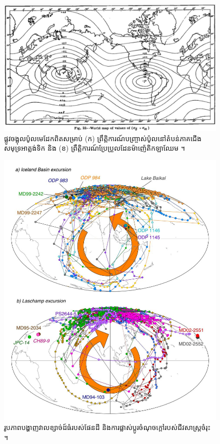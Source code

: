 \documentclass[10pt,twocolumn,letterpaper]{article}
\begin{document}
\begin{figure}[t]
\begin{center}
   \includegraphics[width=1\linewidth]{meinesz3.jpg}
\end{center}
   \caption{ផ្លូវចង្អុលប៉ូលមេដែកពិតសម្រាប់ (ក) ព្រឹត្តិការណ៍បញ្ច្រាស់ប៉ូលនៅតំបន់ភាគជើងសមុទ្រអាត្លង់ទិក និង (ខ) ព្រឹត្តិការណ៍ប្រែប្រួលដែនម៉ាញ៉េតិកឡាឈែម \cite{36}។}
\label{fig:8}

\label{fig:onecol}
\end{figure}

\begin{figure}[t]
\begin{center}
   \includegraphics[width=0.92\linewidth]{laj.jpg}
\end{center}
   \caption{រូបភាពបង្ហាញវាលខ្សាច់ដ៍ធំរបស់ផែនដី និង​ការផ្លាស់ប្តូរចំណុចក្តៅរបស់ជីវសាស្ត្រចំរុះ \cite{35}។}
\label{fig:7}
\label{fig:onecol}
\end{figure}
\end{document}
